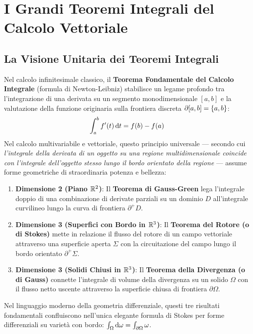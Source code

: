 
\chapter{I Grandi Teoremi Integrali del Calcolo Vettoriale}
\label{chap:teoremi_integrali_calcolo_vettoriale}

\section{La Visione Unitaria dei Teoremi Integrali}

Nel calcolo infinitesimale classico, il \textbf{Teorema Fondamentale del Calcolo Integrale} (formula di Newton-Leibniz) stabilisce un legame profondo tra l'integrazione di una derivata su un segmento monodimensionale $[a,b]$ e la valutazione della funzione originaria sulla frontiera discreta $\partial [a,b] = \{a, b\}$:
\[
\int_{a}^{b} f'(t) \mathop{}\!\mathrm{d} t = f(b) - f(a)
\]
Nel calcolo multivariabile e vettoriale, questo principio universale --- secondo cui \textit{l'integrale della derivata di un oggetto su una regione multidimensionale coincide con l'integrale dell'oggetto stesso lungo il bordo orientato della regione} --- assume forme geometriche di straordinaria potenza e bellezza:
\begin{enumerate}
    \item \textbf{Dimensione 2 (Piano $\mathbb{R}^2$)}: Il \textbf{Teorema di Gauss-Green} lega l'integrale doppio di una combinazione di derivate parziali su un dominio $D$ all'integrale curvilineo lungo la curva di frontiera $\partial^+ D$.
    \item \textbf{Dimensione 3 (Superfici con Bordo in $\mathbb{R}^3$)}: Il \textbf{Teorema del Rotore (o di Stokes)} mette in relazione il flusso del rotore di un campo vettoriale attraverso una superficie aperta $\Sigma$ con la circuitazione del campo lungo il bordo orientato $\partial^+ \Sigma$.
    \item \textbf{Dimensione 3 (Solidi Chiusi in $\mathbb{R}^3$)}: Il \textbf{Teorema della Divergenza (o di Gauss)} connette l'integrale di volume della divergenza su un solido $\Omega$ con il flusso netto uscente attraverso la superficie chiusa di frontiera $\partial \Omega$.
\end{enumerate}
Nel linguaggio moderno della geometria differenziale, questi tre risultati fondamentali confluiscono nell'unica elegante formula di Stokes per forme differenziali su varietà con bordo: $\int_{\Omega} \mathop{}\!\mathrm{d}\omega = \int_{\partial \Omega} \omega$.

